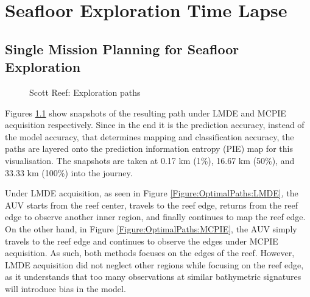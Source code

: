\chapter{Seafloor Exploration Time Lapse}
\label{Appendix:SeafloorExplorationTimeLapse}

	\section{Single Mission Planning for Seafloor Exploration}
	\label{Appendix:SeafloorExplorationTimeLapse:Single}
	
			\begin{figure}[!htbp]
			\centering
			\caption{Scott Reef: Exploration paths}
			\label{Figure:OptimalPaths}
			\end{figure}
			
			Figures \ref{Figure:OptimalPaths} show snapshots of the resulting path under LMDE and MCPIE acquisition respectively. Since in the end it is the prediction accuracy, instead of the model accuracy, that determines mapping and classification accuracy, the paths are layered onto the prediction information entropy (PIE) map for this visualisation. The snapshots are taken at 0.17 km (1\%), 16.67 km (50\%), and 33.33 km (100\%) into the journey.

			Under LMDE acquisition, as seen in Figure \ref{Figure:OptimalPaths:LMDE}, the AUV starts from the reef center, travels to the reef edge, returns from the reef edge to observe another inner region, and finally continues to map the reef edge. On the other hand, in Figure \ref{Figure:OptimalPaths:MCPIE}, the AUV simply travels to the reef edge and continues to observe the edges under MCPIE acquisition. As such, both methods focuses on the edges of the reef. However, LMDE acquisition did not neglect other regions while focusing on the reef edge, as it understands that too many observations at similar bathymetric signatures will introduce bias in the model.
			
